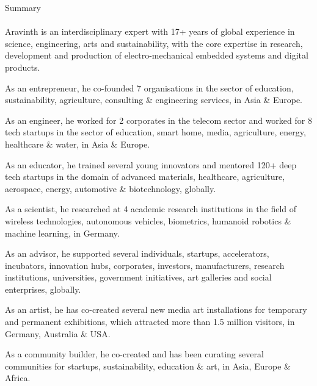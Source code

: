 \clearpage
\pagebreak
{
	\centering
	\Huge Summary
	\par
}

\paragraph{}
\Large
Aravinth is an interdisciplinary expert with 17+ years of global experience in science, engineering, arts and sustainability, with the core expertise in research, development and production of electro-mechanical embedded systems and digital products.

As an entrepreneur, he co-founded 7 organisations in the sector of education, sustainability, agriculture, consulting \& engineering services, in Asia \& Europe.

As an engineer, he worked for 2 corporates in the telecom sector and worked for 8 tech startups in the sector of education, smart home, media, agriculture, energy, healthcare \& water, in Asia \& Europe.

As an educator, he trained several young innovators and mentored 120+ deep tech startups in the domain of advanced materials, healthcare, agriculture, aerospace, energy, automotive \& biotechnology, globally.

As a scientist, he researched at 4 academic research institutions in the field of wireless technologies, autonomous vehicles, biometrics, humanoid robotics \& machine learning, in Germany.

As an advisor, he supported several individuals, startups, accelerators, incubators, innovation hubs, corporates, investors, manufacturers, research institutions, universities, government initiatives, art galleries and social enterprises, globally.

As an artist, he has co-created several new media art installations for temporary and permanent exhibitions, which attracted more than 1.5 million visitors, in Germany, Australia \& USA.

As a community builder, he co-created and has been curating several communities for startups, sustainability, education \& art, in Asia, Europe \& Africa.

\clearpage
